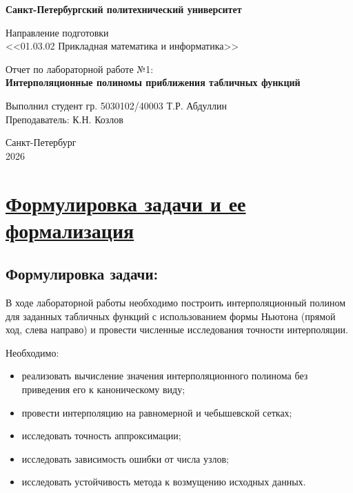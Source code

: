 \documentclass[14pt]{extarticle}
\begin{document}
	
	\thispagestyle{empty}
	
	\begin{center}
		
		\textbf{Санкт-Петербургский политехнический университет}\\
		\vspace{2cm}
		
		Направление подготовки \\
		\large <<01.03.02 Прикладная математика и информатика>>\\
		
		\vspace{7cm}
		
		Отчет по лабораторной работе №1:\\
		\vspace{0.2cm}
		\textbf{\LARGE Интерполяционные полиномы приближения табличных функций}
		
		\vspace{6cm}
		
		\begin{flushleft}
			Выполнил студент гр. 5030102/40003 \hfill Т.Р. Абдуллин\\
			Преподаватель: \hfill К.Н. Козлов\\
		\end{flushleft}
		
		\vspace{3cm}
		
		Санкт-Петербург\\
		2026
	\end{center}
	
	
	\tableofcontents
	
	\newpage
	\section{\Large \underline{Формулировка задачи и ее формализация}}
	
	\subsection{Формулировка задачи:}
	В ходе лабораторной работы необходимо построить интерполяционный полином для заданных табличных функций с использованием формы Ньютона (прямой ход, слева направо) и провести численные исследования точности интерполяции.
	
	Необходимо:
	\begin{itemize}
		\item реализовать вычисление значения интерполяционного полинома без приведения его к каноническому виду;
		\item провести интерполяцию на равномерной и чебышевской сетках;
		\item исследовать точность аппроксимации;
		\item исследовать зависимость ошибки от числа узлов;
		\item исследовать устойчивость метода к возмущению исходных данных.
	\end{itemize}
	
\end{document}
